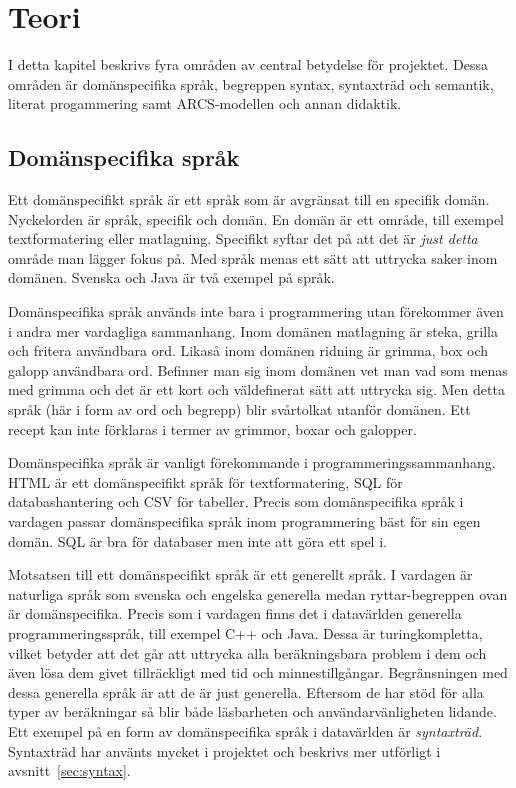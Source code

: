 
\chapter{Teori}

\begin{draft}

I detta kapitel beskrivs fyra områden av central betydelse för projektet. Dessa
områden är domänspecifika språk, begreppen syntax, syntaxträd och semantik,
literat progammering samt ARCS-modellen och annan didaktik.

\section{Domänspecifika språk}

Ett domänspecifikt språk är ett språk som är avgränsat till en specifik domän.
Nyckelorden är språk, specifik och domän. En domän är ett område, till exempel
textformatering eller matlagning. Specifikt syftar det på att det är \textit{just
detta} område man lägger fokus på. Med språk menas ett sätt att uttrycka
saker inom domänen. Svenska och Java är två exempel på språk.

Domänspecifika språk används inte bara i programmering utan förekommer även i
andra mer vardagliga sammanhang. Inom domänen matlagning är steka, grilla och
fritera användbara ord. Likaså inom domänen ridning är grimma, box och galopp
användbara ord. Befinner man sig inom domänen vet man vad som menas med grimma
och det är ett kort och väldefinerat sätt att uttrycka sig. Men detta språk (här
i form av ord och begrepp) blir svårtolkat utanför domänen. Ett recept kan inte
förklaras i termer av grimmor, boxar och galopper.

Domänspecifika språk är vanligt förekommande i programmeringssammanhang. HTML är
ett domänspecifikt språk för textformatering, SQL för databashantering och
CSV för tabeller. Precis som domänspecifika språk i vardagen passar
domänspecifika språk inom programmering bäst för sin egen domän. SQL är bra för
databaser men inte att göra ett spel i.

Motsatsen till ett domänspecifikt språk är ett generellt språk. I vardagen är
naturliga språk som svenska och engelska generella medan ryttar-begreppen ovan
är domänspecifika. Precis som i vardagen finns det i datavärlden generella
programmeringsspråk, till exempel C++ och Java. Dessa är turingkompletta, vilket betyder
att det går att uttrycka alla beräkningsbara problem i dem och även lösa dem
givet tillräckligt med tid och
minnestillgångar\cite{turing_ne}\cite{turing_book}. Begränsningen med dessa
generella språk är att de är just generella. Eftersom de har stöd för
alla typer av beräkningar så blir både läsbarheten och användarvänligheten
lidande. Ett exempel på en form av domänspecifika språk i datavärlden är \textit{syntaxträd}. Syntaxträd har
använts mycket i projektet och beskrivs mer utförligt i
avsnitt~\ref{sec:syntax}.


\end{draft}
